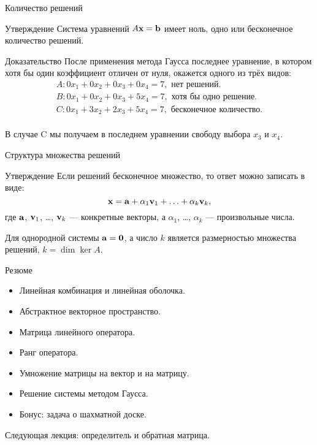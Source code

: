 \begin{frame}{Количество решений}
\begin{block}{Утверждение}
Система уравнений $A \mathbf{x} = \mathbf{b}$ имеет ноль, одно или бесконечное количество решений. 
\end{block}
\pause

\begin{block}{Доказательство}
После применения метода Гаусса последнее уравнение, в котором хотя бы один коэффициент 
отличен от нуля, окажется одного из трёх видов:
\[
\begin{array}{l}
A: 0x_1 + 0x_2 + 0x_3 + 0x_4 = 7, \text{ нет решений.}\\    
B: 0x_1 + 0x_2 + 0x_3 + 5x_4 = 7, \text{ хотя бы одно решение.} \\
C: 0x_1 + 3x_2 + 2x_3 + 5x_4 = 7, \text{ бесконечное количество.} \\
\end{array}
\]
\end{block}
\pause

В случае C мы получаем в последнем уравнении свободу выбора $x_3$ и $x_4$.

\end{frame}



\begin{frame}{Структура множества решений}

\begin{block}{Утверждение}
Если решений бесконечное множество, то ответ можно записать в виде:
\[
\mathbf{x} = \mathbf{a} + \alpha_1 \mathbf{v}_1 + \ldots + \alpha_k \mathbf{v}_k,
\]
где $\mathbf{a}$, $\mathbf{v}_1$, \ldots, $\mathbf{v}_k$ — конкретные векторы, а
$\alpha_1$, \ldots, $\alpha_k$ — произвольные числа. 
\end{block}

\pause
Для однородной системы $\mathbf{a}=\mathbf{0}$, 
    а число $k$ является размерностью множества решений, $k=\dim\ker A$.

\end{frame}




\begin{frame}{Резюме}


\begin{itemize}[<+->]
\item Линейная комбинация и линейная оболочка.
\item Абстрактное векторное пространство.
\item Матрица линейного оператора.
\item Ранг оператора. 
\item Умножение матрицы на вектор и на матрицу.
\item Решение системы методом Гаусса.
\item Бонус: задача о шахматной доске.
\end{itemize}
\pause
\alert{Следующая лекция:} определитель и обратная матрица.



\end{frame}
    